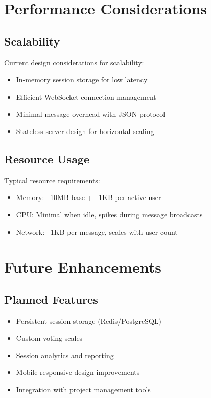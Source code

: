 \documentclass[11pt,a4paper]{article}
\begin{document}
\section{Performance Considerations}

\subsection{Scalability}

Current design considerations for scalability:

\begin{itemize}
    \item In-memory session storage for low latency
    \item Efficient WebSocket connection management
    \item Minimal message overhead with JSON protocol
    \item Stateless server design for horizontal scaling
\end{itemize}

\subsection{Resource Usage}

Typical resource requirements:

\begin{itemize}
    \item Memory: ~10MB base + ~1KB per active user
    \item CPU: Minimal when idle, spikes during message broadcasts
    \item Network: ~1KB per message, scales with user count
\end{itemize}

\section{Future Enhancements}

\subsection{Planned Features}

\begin{itemize}
    \item Persistent session storage (Redis/PostgreSQL)
    \item Custom voting scales
    \item Session analytics and reporting
    \item Mobile-responsive design improvements
    \item Integration with project management tools
\end{itemize}
\end{document}
